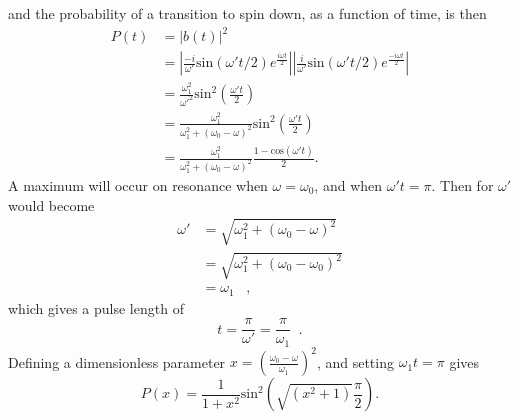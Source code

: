 %
and the probability of a transition to spin down, as a function of
time, is then
%
\begin{equation}
\begin{split}
P(t) &= |b(t)|^2 \\
&= |\frac{-i}{\omega'}\textrm{sin}(\omega' t/2) e^{\frac{i\omega t}{2}}||\frac{i}{\omega'}\textrm{sin}(\omega' t/2) e^{\frac{-i\omega t}{2}}| \\
&=\frac{\omega_1^2}{\omega'^2}\textrm{sin}^{2}(\frac{\omega' t}{2}) \\
&=\frac{\omega_1^2}{\omega_{1}^2 + (\omega_0 - \omega)^2}\textrm{sin}^{2}(\frac{\omega' t}{2}) \\
&=\frac{\omega_1^2}{\omega_{1}^2 + (\omega_0 - \omega)^2}\frac{1- \textrm{cos}(\omega' t)}{2}.
\end{split}
\end{equation}
%
A maximum will occur on resonance when $\omega = \omega_0$, and when
$\omega ' t = \pi$. Then for $\omega'$ would become
%
\begin{equation}
\begin{split}
\omega' &= \sqrt{\omega_{1}^{2} + (\omega_{0}-\omega)^{2}} \\
& = \sqrt{\omega_{1}^{2} + (\omega_{0}-\omega_0)^{2}} \\
& = \omega_{1} \;\;\; ,
\end{split}
\end{equation}
%
which gives a pulse length of
\begin{equation}
t = \frac{\pi}{\omega'} =\frac{\pi}{\omega_1} \;\; .
\end{equation}
%
Defining a dimensionless parameter $x = (\frac{\omega_0 - \omega}{\omega_1})^2$, and setting $\omega_1 t = \pi$ gives
%
\begin{equation}
P(x)=\frac{1}{1 + x^2}\textrm{sin}^{2}(\sqrt{(x^2 +1)}\frac{\pi}{2}).
\end{equation}


